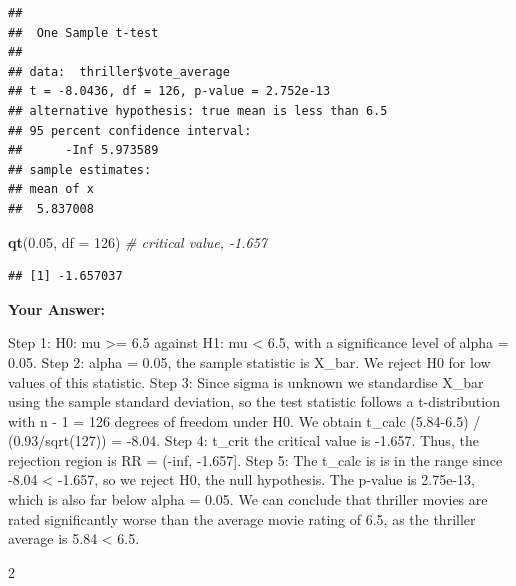 \documentclass[
]{article}
\newenvironment{Shaded}{\begin{snugshade}}{\end{snugshade}}
\newcommand{\AttributeTok}[1]{\textcolor[rgb]{0.13,0.29,0.53}{#1}}
\newcommand{\CommentTok}[1]{\textcolor[rgb]{0.56,0.35,0.01}{\textit{#1}}}
\newcommand{\DecValTok}[1]{\textcolor[rgb]{0.00,0.00,0.81}{#1}}
\newcommand{\FloatTok}[1]{\textcolor[rgb]{0.00,0.00,0.81}{#1}}
\newcommand{\FunctionTok}[1]{\textcolor[rgb]{0.13,0.29,0.53}{\textbf{#1}}}
\newcommand{\NormalTok}[1]{#1}
\begin{document}
\begin{verbatim}
## 
##  One Sample t-test
## 
## data:  thriller$vote_average
## t = -8.0436, df = 126, p-value = 2.752e-13
## alternative hypothesis: true mean is less than 6.5
## 95 percent confidence interval:
##      -Inf 5.973589
## sample estimates:
## mean of x 
##  5.837008
\end{verbatim}

\begin{Shaded}
\begin{Highlighting}[]
\FunctionTok{qt}\NormalTok{(}\FloatTok{0.05}\NormalTok{, }\AttributeTok{df =} \DecValTok{126}\NormalTok{)   }\CommentTok{\# critical value, {-}1.657}
\end{Highlighting}
\end{Shaded}

\begin{verbatim}
## [1] -1.657037
\end{verbatim}

\textbf{Your Answer:}

Step 1: H0: mu \textgreater= 6.5 against H1: mu \textless{} 6.5, with a
significance level of alpha = 0.05. Step 2: alpha = 0.05, the sample
statistic is X\_bar. We reject H0 for low values of this statistic. Step
3: Since sigma is unknown we standardise X\_bar using the sample
standard deviation, so the test statistic follows a t-distribution with
n - 1 = 126 degrees of freedom under H0. We obtain t\_calc (5.84-6.5) /
(0.93/sqrt(127)) = -8.04. Step 4: t\_crit the critical value is -1.657.
Thus, the rejection region is RR = (-inf, -1.657{]}. Step 5: The t\_calc
is is in the range since -8.04 \textless{} -1.657, so we reject H0, the
null hypothesis. The p-value is 2.75e-13, which is also far below alpha
= 0.05. We can conclude that thriller movies are rated significantly
worse than the average movie rating of 6.5, as the thriller average is
5.84 \textless{} 6.5.

2
\end{document}

